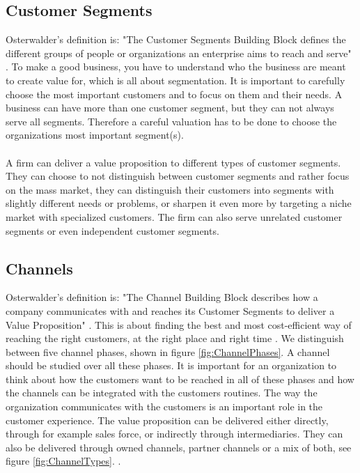 \subsection{Customer Segments}
Osterwalder's definition is: "The Customer Segments Building Block defines the different groups of people or organizations an enterprise aims to reach and serve" \cite{osterwalder}. To make a good business, you have to understand who the business are meant to create value for, which is all about segmentation. It is important to carefully choose the most important customers and to focus on them and their needs. A business can have more than one customer segment, but they can not always serve all segments. Therefore a careful valuation has to be done to choose the organizations most important segment(s). \cite{osterwalder} \cite{osterwalderthesis} \\ \\
A firm can deliver a value proposition to different types of customer segments. They can choose to not distinguish between customer segments and rather focus on the mass market, they can distinguish their customers into segments with slightly different needs or problems, or sharpen it even more by targeting a niche market with specialized customers. The firm can also serve unrelated customer segments or even independent customer segments. \cite{osterwalder}

\subsection{Channels}
Osterwalder's definition is: "The Channel Building Block describes how a company communicates with and reaches its Customer Segments to deliver a Value Proposition" \cite{osterwalder}. This is about finding the best and most cost-efficient way of reaching the right customers, at the right place and right time \cite{osterwalderthesis}. We distinguish between five channel phases, shown in figure \ref{fig:ChannelPhases}. A channel should be studied over all these phases. It is important for an organization to think about how the customers want to be reached in all of these phases and how the channels can be integrated with the customers routines. The way the organization communicates with the customers is an important role in the customer experience. The value proposition can be delivered either directly, through for example sales force, or indirectly through intermediaries. They can also be delivered through owned channels, partner channels or a mix of both, see figure  \ref{fig:ChannelTypes}.
 \cite{osterwalderthesis}. \\ \\

